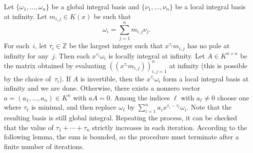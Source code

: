 \documentclass[final,1p,times,authoryear]{elsarticle}
\let\set\mathbb
\begin{document}
Let $\{\omega_1,\dots,\omega_n\}$ be a global integral basis and $\{\nu_1,\dots,\nu_n\}$ be a local
integral basis at infinity. Let $m_{i,j}\in K(x)$ be such that
\[
 \omega_i = \sum_{j=1}^n m_{i,j}\nu_j.
\]
For each~$i$, let $\tau_i\in\set Z$ be the largest integer such that $x^{\tau_i}m_{i,j}$ has no pole at infinity for any~$j$.
Then each $x^{\tau_i}\omega_i$ is locally integral at infinity.
Let $A\in K^{n\times n}$ be the matrix obtained by evaluating $((x^{\tau_i}m_{i,j}))_{i,j=1}^n$ at infinity
(this is possible by the choice of~$\tau_i$).
If $A$ is invertible, then the $x^{\tau_i}\omega_i$ form a local integral basis at infinity and we are done.
Otherwise, there exists a nonzero vector $a=(a_1,\dots,a_n)\in K^n$ with $aA=0$.
Among the indices $\ell$ with $a_\ell\neq0$ choose one where $\tau_\ell$ is minimal,
and then replace $\omega_\ell$ by $\sum_{i=1}^n a_i x^{\tau_i-\tau_\ell}\omega_i$.
Note that the resulting basis is still global integral.
Repeating the process, it can be checked that the value of $\tau_1+\cdots+\tau_n$ strictly increases in each iteration.
According to the following lemma, the sum is bounded, so the procedure must terminate after a finite
number of iterations.
\end{document}
